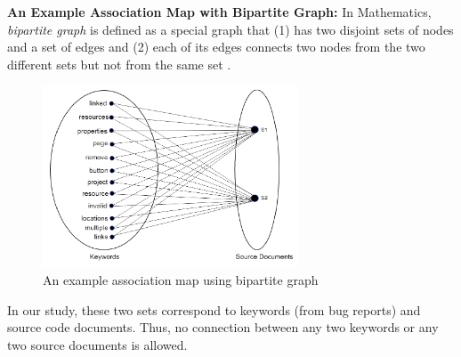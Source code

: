 \documentclass[conference]{IEEEtran}
\begin{document}
\textbf{An Example Association Map with Bipartite Graph:} In Mathematics, \emph{bipartite graph} is defined as a special graph that   
(1) has two disjoint sets of nodes and a set of edges and (2) each of its edges connects two nodes from the two different sets but not from the same set \cite{bipartite}.  
\begin{table}[!tb]
	\caption{An Example Bug Report (\#322401, eclipse.ui.platform)}
	\label{tab:BugInfo2}
	\vspace{-.2cm}
  \vspace{-.2cm}
\end{table}
\begin{figure}
	\centering
	\includegraphics[width=3in]{BGraph5}
	\caption{An example association map using bipartite graph}
	\label{fig:BipartiteGraph}
	\vspace{-.5cm}
\end{figure}
In our study, these two sets correspond to keywords (from bug reports) and source code documents. 
Thus, no connection between any two keywords or any two source documents is allowed.
\end{document}
